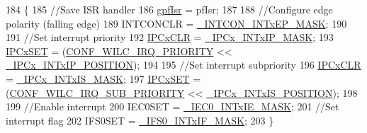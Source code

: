 \begin{DoxyCode}
184 \{
185    \textcolor{comment}{//Save ISR handler}
186    \hyperlink{nm__bsp__pic32mz_8c_a1fc16160cd8e35ab3f77abb4bc40477e}{gpfIsr} = pfIsr;
187 
188    \textcolor{comment}{//Configure edge polarity (falling edge)}
189    INTCONCLR = \hyperlink{nm__bsp__pic32mz_8c_a7df53133a378ae15fbe8f42fbfb9d507}{\_INTCON\_INTxEP\_MASK};
190 
191    \textcolor{comment}{//Set interrupt priority}
192    \hyperlink{nm__bsp__pic32mz_8c_ab78bf9afd3abd7d7338d0b34f31ea242}{IPCxCLR} = \hyperlink{nm__bsp__pic32mz_8c_a56280648522388be3028f1bf4b4c65f5}{\_IPCx\_INTxIP\_MASK};
193    \hyperlink{nm__bsp__pic32mz_8c_accc6f72c2ad0d4b00b241f291e7db861}{IPCxSET} = (\hyperlink{wilc1000__config_8h_ad49c3ad20158998cf64742a769570a31}{CONF\_WILC\_IRQ\_PRIORITY} << 
      \hyperlink{nm__bsp__pic32mz_8c_a31250062a2278d623f84361a2dfc129b}{\_IPCx\_INTxIP\_POSITION});
194 
195    \textcolor{comment}{//Set interrupt subpriority}
196    \hyperlink{nm__bsp__pic32mz_8c_ab78bf9afd3abd7d7338d0b34f31ea242}{IPCxCLR} = \hyperlink{nm__bsp__pic32mz_8c_aa74dc1e257bb2ec81ab6489b5e24fef8}{\_IPCx\_INTxIS\_MASK};
197    \hyperlink{nm__bsp__pic32mz_8c_accc6f72c2ad0d4b00b241f291e7db861}{IPCxSET} = (\hyperlink{wilc1000__config_8h_a279e1127940b388b4833244554bc2351}{CONF\_WILC\_IRQ\_SUB\_PRIORITY} << 
      \hyperlink{nm__bsp__pic32mz_8c_ae95ac6e56bf07d47a11ba692d718c8a4}{\_IPCx\_INTxIS\_POSITION});
198 
199    \textcolor{comment}{//Enable interrupt}
200    IEC0SET = \hyperlink{nm__bsp__pic32mz_8c_a12a4929e9d91972bb84c11475533c977}{\_IEC0\_INTxIE\_MASK};
201    \textcolor{comment}{//Set interrupt flag}
202    IFS0SET = \hyperlink{nm__bsp__pic32mz_8c_ac8292a659a93351a40133250bcce3f4a}{\_IFS0\_INTxIF\_MASK};
203 \}
\end{DoxyCode}
